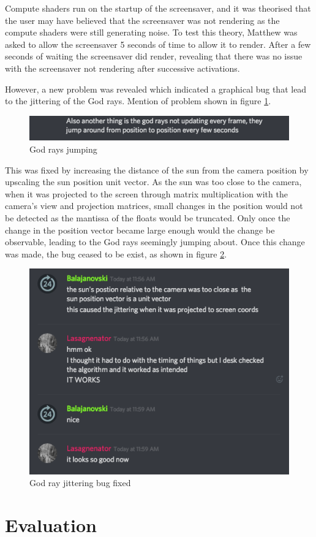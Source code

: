 \documentclass[10pt, openany]{book}
\begin{document}
Compute shaders run on the startup of the screensaver, and it was theorised that the user may have believed that the screensaver was not rendering as the compute shaders were still generating noise. To test this theory, Matthew was asked to allow the screensaver 5 seconds of time to allow it to render. After a few seconds of waiting the screensaver did render, revealing that there was no issue with the screensaver not rendering after successive activations.

However, a new problem was revealed which indicated a graphical bug that lead to the jittering of the God rays. Mention of problem shown in figure \ref{fig:broken-rays}.

\begin{figure}[H]
	\centering
	\includegraphics[width=0.5\linewidth]{testing3}
	\caption{God rays jumping}
	\label{fig:broken-rays}
\end{figure}

This was fixed by increasing the distance of the sun from the camera position by upscaling the sun position unit vector. As the sun was too close to the camera, when it was projected to the screen through matrix multiplication with the camera's view and projection matrices, small changes in the position would not be detected as the mantissa of the floats would be truncated. Only once the change in the position vector became large enough would the change be observable, leading to the God rays seemingly jumping about. Once this change was made, the bug ceased to be exist, as shown in figure \ref{fig:fixed}.

\begin{figure}[H]
	\centering
	\includegraphics[width=0.5\linewidth]{testing4}
	\caption{God ray jittering bug fixed}
	\label{fig:fixed}
\end{figure}

\chapter{Evaluation}
\end{document}
